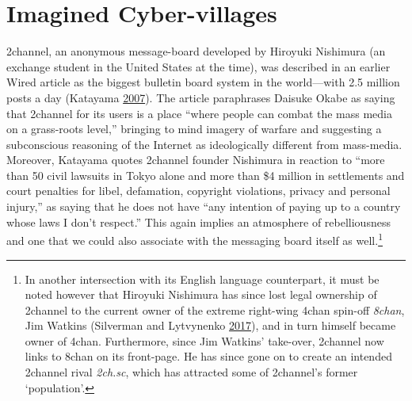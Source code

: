 \documentclass[10pt,british,A4paper,twoside]{memoir}
\begin{document}
\section{Imagined Cyber-villages}\label{imagined-cyber-villages}

2channel, an anonymous message-board developed by Hiroyuki Nishimura (an
exchange student in the United States at the time), was described in an
earlier Wired article as the biggest bulletin board system in the
world---with 2.5 million posts a day (Katayama
\protect\hyperlink{ref-katayama_2-channel_2007}{2007}). The article
paraphrases Daisuke Okabe as saying that 2channel for its users is a
place ``where people can combat the mass media on a grass-roots level,''
bringing to mind imagery of warfare and suggesting a subconscious
reasoning of the Internet as ideologically different from mass-media.
Moreover, Katayama quotes 2channel founder Nishimura in reaction to
``more than 50 civil lawsuits in Tokyo alone and more than \$4 million
in settlements and court penalties for libel, defamation, copyright
violations, privacy and personal injury,'' as saying that he does not
have ``any intention of paying up to a country whose laws I don't
respect.'' This again implies an atmosphere of rebelliousness and one
that we could also associate with the messaging board itself as
well.\footnote{In another intersection with its English language
  counterpart, it must be noted however that Hiroyuki Nishimura has
  since lost legal ownership of 2channel to the current owner of the
  extreme right-wing 4chan spin-off \emph{8chan}, Jim Watkins (Silverman
  and Lytvynenko \protect\hyperlink{ref-silverman_meet_2017}{2017}), and
  in turn himself became owner of 4chan. Furthermore, since Jim Watkins'
  take-over, 2channel now links to 8chan on its front-page. He has since
  gone on to create an intended 2channel rival \emph{2ch.sc}, which has
  attracted some of 2channel's former `population'.}
\end{document}

